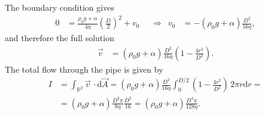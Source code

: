 \documentclass[english, parskip=full]{scrartcl}
\newcommand{\intx}{}
\newcommand{\intr}{}
\newcommand{\kla}{}
\begin{document}
The boundary condition gives
\begin{align}
0 &= \frac{\rho_0g + \alpha}{4\eta} \kla\left( {\frac{D}{2}} \right)^2 + v_0 &&\Rightarrow & v_0 &= -(\rho_0g + \alpha)\frac{D^2}{16\eta},
\end{align}
and therefore the full solution
\begin{align}
\vec{v} &= (\rho_0g + \alpha)\frac{D^2}{16\eta} \kla\left( {1 - \frac{4r^2}{D^2}} \right).
\end{align}
The total flow through the pipe is given by 
\begin{align}
I &= \intr\int_{\mathbb{R}^{2}}{\vec{v} }\,\cdot \mathrm{d}\vec{A} = (\rho_0g + \alpha)\frac{D^2}{16\eta}\intx\int_{0}^{D/2} \kla\left( {1 - \frac{4r^2}{D^2}} \right) \,2\pi r\mathrm{d}r = \\
&= (\rho_0g + \alpha)\frac{D^2\pi}{8\eta}\frac{D^2}{16} = (\rho_0g + \alpha)\frac{D^4\pi}{128\eta}.
\end{align}
\end{document}
